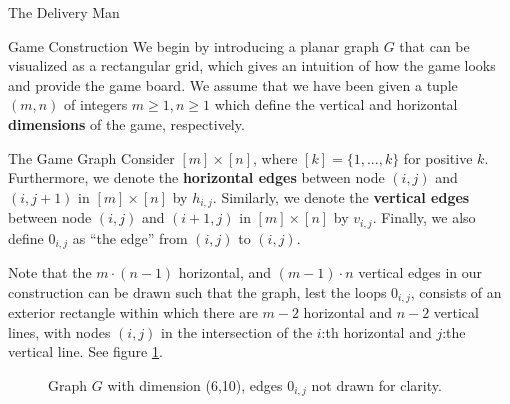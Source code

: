 \begin{section}{The Delivery Man}
  \begin{subsection}{Game Construction}
    We begin by introducing a planar graph $G$ that can be visualized as a rectangular grid, which gives an intuition of how the game looks and provide the game board. We assume that we have been given a tuple $(m, n)$ of integers $m \geq 1, n \geq 1$ which define the vertical and horizontal \textbf{dimensions} of the game, respectively.
    
    \begin{subsubsection}{The Game Graph}
    Consider $[m]\times [n]$, where $[k] = \{1, ..., k\}$ for positive $k$. Furthermore, we denote the \textbf{horizontal edges} between node $(i, j)$ and $(i, j+1)$ in $[m] \times [n]$ by $h_{i,j}$. Similarly, we denote the \textbf{vertical edges} between node $(i, j)$ and $(i+1, j)$ in $[m] \times [n]$ by $v_{i,j}$. Finally, we also define $0_{i,j}$ as ``the edge'' from $(i,j)$ to $(i,j)$. 

    Note that the $m\cdot (n-1)$ horizontal, and $(m-1)\cdot n$ vertical edges in our construction can be drawn such that the graph, lest the loops $0_{i,j}$, consists of an exterior rectangle within which there are $m-2$ horizontal and $n-2$ vertical lines, with nodes $(i, j)$ in the intersection of the $i$:th horizontal and $j$:the vertical line. See figure \ref{fig:grid}.

      \begin{figure}[H]
        \label{fig:grid}
        \centering
        \caption{Graph $G$ with dimension (6,10), edges $0_{i,j}$ not drawn for clarity.}
      \end{figure}
      

\end{subsubsection}
\end{subsection}
\end{section}
